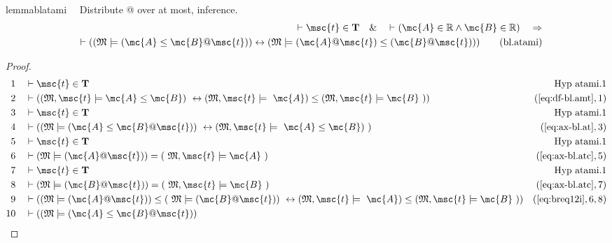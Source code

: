 \begin{restatable}{lemma}{blatami}~~ Distribute @ over at most, inference.
\begin{align}
\vdash \msc{t} \in \mathbf{T}\quad\&\quad \vdash ( \mc{A} \in \mathbb{R} \wedge
    \mc{B} \in \mathbb{R} )\quad\Rightarrow \notag \\ 
	\quad \vdash ( ( \mathfrak{M}
    \models ( \mc{A} \le \mc{B} @ \msc{t} ) ) \leftrightarrow ( \mathfrak{M}
    \models ( \mc{A} @ \msc{t} ) \le ( \mc{B} @ \msc{t} ) )
    )\label{eq:bl.atami}\tag{bl.atami}
\end{align}
\end{restatable}

\begin{proof}
\begin{align}
  1 &&  & \vdash \msc{t} \in \mathbf{T}&\text{Hyp~atami.1}\notag%
  \\ 2 &&  & \vdash ( ( \mathfrak{M} , \msc{t} \models \mc{A} \le \mc{B} )
     ~\leftrightarrow ( \mathfrak{M} , \msc{t} \models
     ~\mc{A} ) \le ( \mathfrak{M} , \msc{t} \models \mc{B}
     ~) )&(\mbox{\ref{eq:df-bl.amt}},1)\notag
  \\ 3 &&  & \vdash \msc{t} \in \mathbf{T}&\text{Hyp~atami.1}\notag%
  \\ 4 &&  & \vdash ( ( \mathfrak{M} \models ( \mc{A} \le \mc{B} @ \msc{t} ) )
     ~\leftrightarrow ( \mathfrak{M} , \msc{t} \models
     ~\mc{A} \le \mc{B} )
     ~)&(\mbox{\ref{eq:ax-bl.at}},3)\notag
  \\ 5 &&  & \vdash \msc{t} \in \mathbf{T}&\text{Hyp~atami.1}\notag%
  \\ 6 &&  & \vdash ( \mathfrak{M} \models ( \mc{A} @ \msc{t} ) ) = (
     ~\mathfrak{M} , \msc{t} \models \mc{A}
     ~)&(\mbox{\ref{eq:ax-bl.atc}},5)\notag
  \\ 7 &&  & \vdash \msc{t} \in \mathbf{T}&\text{Hyp~atami.1}\notag%
  \\ 8 &&  & \vdash ( \mathfrak{M} \models ( \mc{B} @ \msc{t} ) ) = (
     ~\mathfrak{M} , \msc{t} \models \mc{B}
     ~)&(\mbox{\ref{eq:ax-bl.atc}},7)\notag
  \\ 9 &&  & \vdash ( ( \mathfrak{M} \models ( \mc{A} @ \msc{t} ) ) \le (
     ~\mathfrak{M} \models ( \mc{B} @ \msc{t} ) )
     ~\leftrightarrow ( \mathfrak{M} , \msc{t} \models
     ~\mc{A} ) \le ( \mathfrak{M} , \msc{t} \models \mc{B}
     ~) )&(\mbox{\ref{eq:breq12i}},6,8)\notag
  \\ 10 &&  & \vdash ( ( \mathfrak{M} \models ( \mc{A} \le \mc{B} @ \msc{t} ) )

\end{align}
\end{proof}
